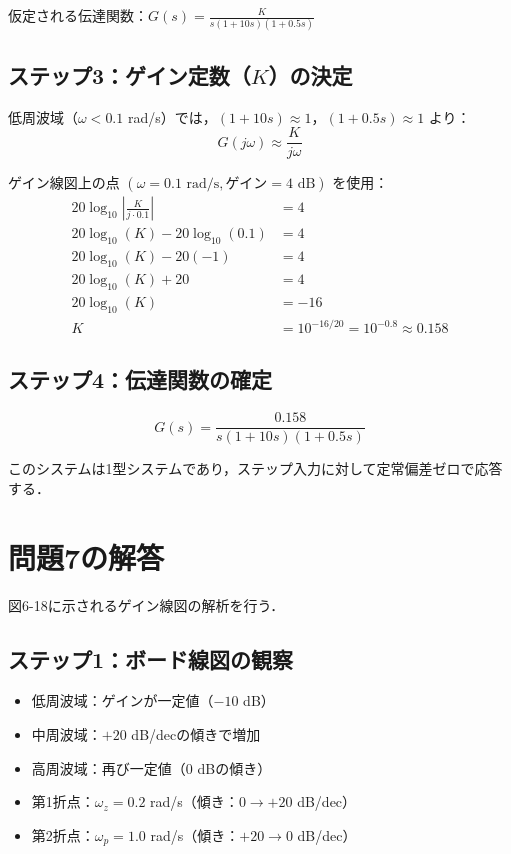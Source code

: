 \documentclass[11pt,a4paper]{ltjsarticle} %
\begin{document}
仮定される伝達関数：$G(s) = \frac{K}{s(1+10s)(1+0.5s)}$

\subsection{ステップ3：ゲイン定数（$K$）の決定}
低周波域（$\omega < 0.1$ rad/s）では，$(1+10s) \approx 1$，$(1+0.5s) \approx 1$ より：
\begin{equation}
G(j\omega) \approx \frac{K}{j\omega}
\end{equation}

ゲイン線図上の点 $(\omega = 0.1 \text{ rad/s}, \text{ゲイン} = 4 \text{ dB})$ を使用：
\begin{align}
20\log_{10}\left|\frac{K}{j \cdot 0.1}\right| &= 4 \\
20\log_{10}(K) - 20\log_{10}(0.1) &= 4 \\
20\log_{10}(K) - 20(-1) &= 4 \\
20\log_{10}(K) + 20 &= 4 \\
20\log_{10}(K) &= -16 \\
K &= 10^{-16/20} = 10^{-0.8} \approx 0.158
\end{align}

\subsection{ステップ4：伝達関数の確定}
\begin{equation}
G(s) = \frac{0.158}{s(1+10s)(1+0.5s)}
\end{equation}

このシステムは1型システムであり，ステップ入力に対して定常偏差ゼロで応答する．

\section{問題7の解答}
図6-18に示されるゲイン線図の解析を行う．

\subsection{ステップ1：ボード線図の観察}
\begin{itemize}
\item 低周波域：ゲインが一定値（$-10$ dB）
\item 中周波域：$+20$ dB/decの傾きで増加
\item 高周波域：再び一定値（0 dBの傾き）
\item 第1折点：$\omega_{z} = 0.2$ rad/s（傾き：$0 \rightarrow +20$ dB/dec）
\item 第2折点：$\omega_{p} = 1.0$ rad/s（傾き：$+20 \rightarrow 0$ dB/dec）
\end{itemize}
\end{document}
